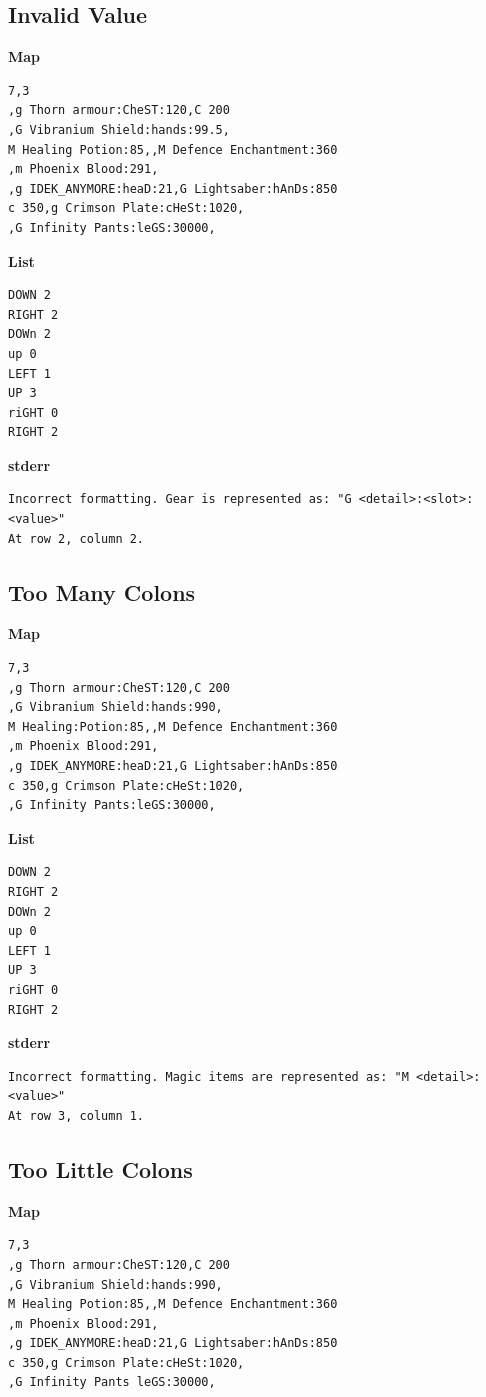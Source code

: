 \documentclass{article}
\begin{document}
\subsection{Invalid Value}

\quad \textbf{Map}
\begin{lstlisting}
7,3
,g Thorn armour:CheST:120,C 200
,G Vibranium Shield:hands:99.5,
M Healing Potion:85,,M Defence Enchantment:360
,m Phoenix Blood:291,
,g IDEK_ANYMORE:heaD:21,G Lightsaber:hAnDs:850
c 350,g Crimson Plate:cHeSt:1020,
,G Infinity Pants:leGS:30000,
\end{lstlisting}

\textbf{List}
\begin{lstlisting}
DOWN 2
RIGHT 2
DOWn 2
up 0
LEFT 1
UP 3
riGHT 0
RIGHT 2
\end{lstlisting}
\pagebreak

\textbf{stderr}
\begin{lstlisting}
Incorrect formatting. Gear is represented as: "G <detail>:<slot>:<value>"
At row 2, column 2.
\end{lstlisting}

\subsection{Too Many Colons}

\quad \textbf{Map}
\begin{lstlisting}
7,3
,g Thorn armour:CheST:120,C 200
,G Vibranium Shield:hands:990,
M Healing:Potion:85,,M Defence Enchantment:360
,m Phoenix Blood:291,
,g IDEK_ANYMORE:heaD:21,G Lightsaber:hAnDs:850
c 350,g Crimson Plate:cHeSt:1020,
,G Infinity Pants:leGS:30000,
\end{lstlisting}

\textbf{List}
\begin{lstlisting}
DOWN 2
RIGHT 2
DOWn 2
up 0
LEFT 1
UP 3
riGHT 0
RIGHT 2
\end{lstlisting}
\pagebreak

\textbf{stderr}
\begin{lstlisting}
Incorrect formatting. Magic items are represented as: "M <detail>:<value>"
At row 3, column 1.
\end{lstlisting}

\subsection{Too Little Colons}

\quad \textbf{Map}
\begin{lstlisting}
7,3
,g Thorn armour:CheST:120,C 200
,G Vibranium Shield:hands:990,
M Healing Potion:85,,M Defence Enchantment:360
,m Phoenix Blood:291,
,g IDEK_ANYMORE:heaD:21,G Lightsaber:hAnDs:850
c 350,g Crimson Plate:cHeSt:1020,
,G Infinity Pants leGS:30000,
\end{lstlisting}
\end{document}
